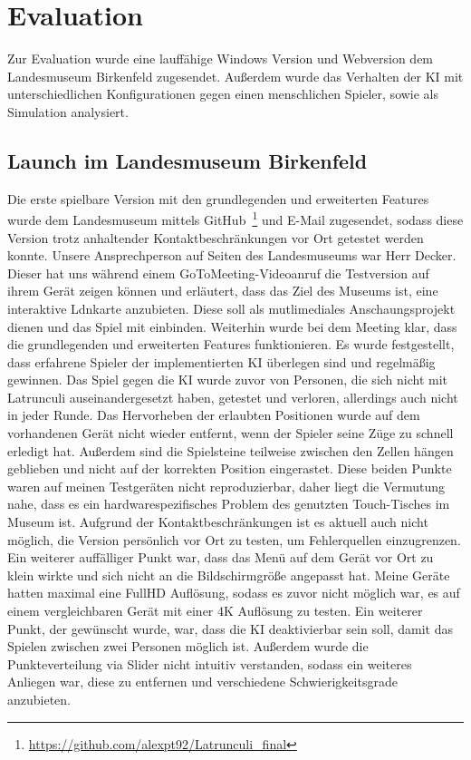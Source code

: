 
\chapter{Evaluation}
\label{ch:Evaluierung}
Zur Evaluation wurde eine lauffähige Windows Version und Webversion dem Landesmuseum Birkenfeld zugesendet. Außerdem wurde das Verhalten der KI mit unterschiedlichen Konfigurationen gegen einen menschlichen Spieler, sowie als Simulation analysiert.

\section{Launch im Landesmuseum Birkenfeld}
\label{ch:Evaluierung:sec:Launch}
Die erste spielbare Version mit den grundlegenden und erweiterten Features wurde dem Landesmuseum mittels GitHub~\footnote{\url{https://github.com/alexpt92/Latrunculi_final}} und E-Mail zugesendet, sodass diese Version trotz anhaltender Kontaktbeschränkungen vor Ort getestet werden konnte. Unsere Ansprechperson auf Seiten des Landesmuseums war Herr Decker. Dieser hat uns während einem GoToMeeting-Videoanruf die Testversion auf ihrem Gerät zeigen können und erläutert, dass das Ziel des Museums ist, eine interaktive Ldnkarte anzubieten. Diese soll als mutlimediales Anschaungsprojekt dienen und das Spiel mit einbinden. Weiterhin wurde bei dem Meeting klar, dass die grundlegenden und erweiterten Features funktionieren. Es wurde festgestellt, dass erfahrene Spieler der implementierten KI überlegen sind und regelmäßig gewinnen. Das Spiel gegen die KI wurde zuvor von Personen, die sich nicht mit Latrunculi auseinandergesetzt haben, getestet und verloren, allerdings auch nicht in jeder Runde. Das Hervorheben der erlaubten Positionen wurde auf dem vorhandenen Gerät nicht wieder entfernt, wenn der Spieler seine Züge zu schnell erledigt hat. Außerdem sind die Spielsteine teilweise zwischen den Zellen hängen geblieben und nicht auf der korrekten Position eingerastet. Diese beiden Punkte waren auf meinen Testgeräten nicht reproduzierbar, daher liegt die Vermutung nahe, dass es ein hardwarespezifisches Problem des genutzten Touch-Tisches im Museum ist. Aufgrund der Kontaktbeschränkungen ist es aktuell auch nicht möglich, die Version persönlich vor Ort zu testen, um Fehlerquellen einzugrenzen. Ein weiterer auffälliger Punkt war, dass das Menü auf dem Gerät vor Ort zu klein wirkte und sich nicht an die Bildschirmgröße angepasst hat. Meine Geräte hatten maximal eine FullHD Auflösung, sodass es zuvor nicht möglich war, es auf einem vergleichbaren Gerät mit einer 4K Auflösung zu testen.
Ein weiterer Punkt, der gewünscht wurde, war, dass die KI deaktivierbar sein soll, damit das Spielen zwischen zwei Personen möglich ist. Außerdem wurde die Punkteverteilung via Slider nicht intuitiv verstanden, sodass ein weiteres Anliegen war, diese zu entfernen und verschiedene Schwierigkeitsgrade anzubieten.
